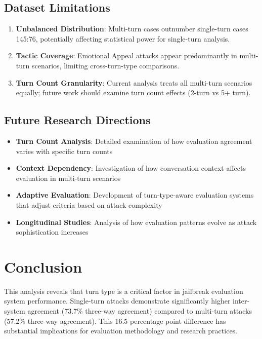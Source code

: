 \documentclass[11pt]{article}
\begin{document}
\subsection{Dataset Limitations}

\begin{enumerate}
    \item \textbf{Unbalanced Distribution}: Multi-turn cases outnumber single-turn cases 145:76, potentially affecting statistical power for single-turn analysis.
    \item \textbf{Tactic Coverage}: Emotional Appeal attacks appear predominantly in multi-turn scenarios, limiting cross-turn-type comparisons.
    \item \textbf{Turn Count Granularity}: Current analysis treats all multi-turn scenarios equally; future work should examine turn count effects (2-turn vs 5+ turn).
\end{enumerate}

\subsection{Future Research Directions}

\begin{itemize}
    \item \textbf{Turn Count Analysis}: Detailed examination of how evaluation agreement varies with specific turn counts
    \item \textbf{Context Dependency}: Investigation of how conversation context affects evaluation in multi-turn scenarios
    \item \textbf{Adaptive Evaluation}: Development of turn-type-aware evaluation systems that adjust criteria based on attack complexity
    \item \textbf{Longitudinal Studies}: Analysis of how evaluation patterns evolve as attack sophistication increases
\end{itemize}

\section{Conclusion}

This analysis reveals that turn type is a critical factor in jailbreak evaluation system performance. Single-turn attacks demonstrate significantly higher inter-system agreement (73.7\% three-way agreement) compared to multi-turn attacks (57.2\% three-way agreement). This 16.5 percentage point difference has substantial implications for evaluation methodology and research practices.
\end{document}
